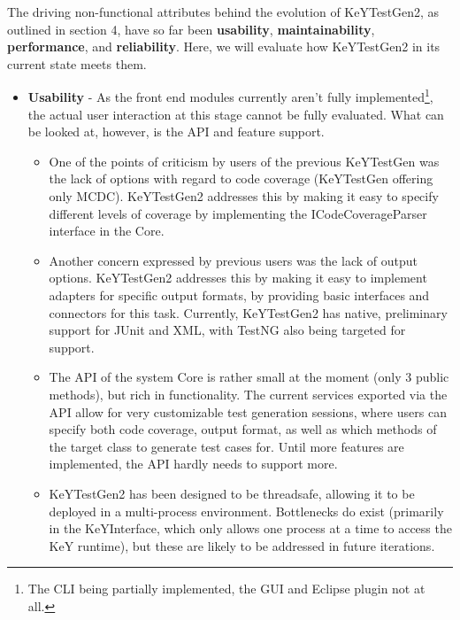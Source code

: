 \documentclass{article}
\newcommand{\tmstrong}[1]{\textbf{#1}}
\newenvironment{itemizedot}{\begin{itemize} \renewcommand{\labelitemi}{$\bullet$}\renewcommand{\labelitemii}{$\bullet$}\renewcommand{\labelitemiii}{$\bullet$}\renewcommand{\labelitemiv}{$\bullet$}}{\end{itemize}}
\newenvironment{itemizeminus}{\begin{itemize} \renewcommand{\labelitemi}{$-$}\renewcommand{\labelitemii}{$-$}\renewcommand{\labelitemiii}{$-$}\renewcommand{\labelitemiv}{$-$}}{\end{itemize}}
\begin{document}
The driving non-functional attributes behind the evolution of KeYTestGen2, as
outlined in section 4, have so far been {\tmstrong{usability}},
{\tmstrong{maintainability}}, {\tmstrong{performance}}, and
{\tmstrong{reliability}}. Here, we will evaluate how KeYTestGen2 in its
current state meets them.
\begin{itemizedot}
  \item {\tmstrong{Usability}} - As the front end modules currently aren't
  fully implemented{\footnote{The CLI being partially implemented, the GUI and
  Eclipse plugin not at all.}}, the actual user interaction at this stage
  cannot be fully evaluated. What can be looked at, however, is the API and
  feature support.
  \begin{itemizeminus}
    \item One of the points of criticism by users of the previous KeYTestGen
    was the lack of options with regard to code coverage (KeYTestGen offering
    only MCDC). KeYTestGen2 addresses this by making it easy to specify
    different levels of coverage by implementing the ICodeCoverageParser
    interface in the Core.
    
    \item Another concern expressed by previous users was the lack of output
    options. KeYTestGen2 addresses this by making it easy to implement
    adapters for specific output formats, by providing basic interfaces and
    connectors for this task. Currently, KeYTestGen2 has native, preliminary
    support for JUnit and XML, with TestNG also being targeted for support.
    
    \item The API of the system Core is rather small at the moment (only 3
    public methods), but rich in functionality. The current services exported
    via the API allow for very customizable test generation sessions, where
    users can specify both code coverage, output format, as well as which
    methods of the target class to generate test cases for. Until more
    features are implemented, the API hardly needs to support more.
    
    \item KeYTestGen2 has been designed to be threadsafe, allowing it to be
    deployed in a multi-process environment. Bottlenecks do exist (primarily
    in the KeYInterface, which only allows one process at a time to access the
    KeY runtime), but these are likely to be addressed in future iterations.
    

\end{itemizeminus}
\end{itemizedot}
\end{document}
